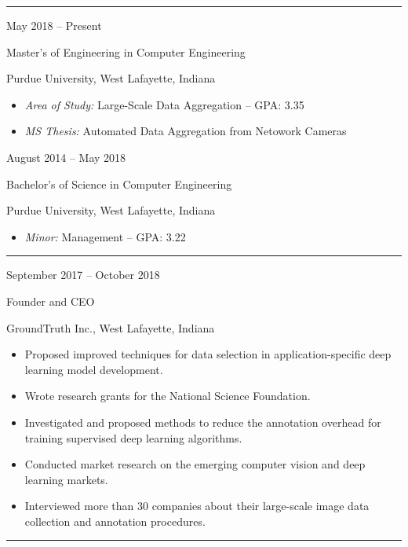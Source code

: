 \documentclass[10pt]{article}
\newlength{\cvcolumngapwidth}
\newlength{\cvleftcolumnwidth}
\newlength{\cvrightcolumnwidth}
\newcommand{\cvsectionstyle}[1]{{\normalsize\cvsectionfont\textcolor{cvsectioncolor}{#1}}}
\newcommand{\cvtitlestyle}[1]{{\large\cvtitlefont\textcolor{cvtitlecolor}{#1}}}
\newcommand{\cvdurationstyle}[1]{{\small\cvdurationfont\textcolor{cvdurationcolor}{#1}}}
\newlength{\cvafteritemskipamount}
\newlength{\cvaftersectionskipamount}
\newlength{\cvparskip}
\newcommand{\cvsection}[1]{
    \begin{minipage}[t]{\cvleftcolumnwidth}
        \raggedleft\cvsectionstyle{#1}
    \end{minipage}%
    \hspace{\cvcolumngapwidth}%
    \begin{minipage}[t]{\cvrightcolumnwidth}
        \textcolor{cvrulecolor}{\rule{\cvrightcolumnwidth}{0.3mm}}
    \end{minipage}

    \vspace{\cvaftersectionskipamount}
}
\newcommand{\cvitem}[2]{
    \begin{minipage}[t]{\cvleftcolumnwidth}
        \raggedleft #1
    \end{minipage}%
    \hspace{\cvcolumngapwidth}%
    \begin{minipage}[t]{\cvrightcolumnwidth}
        \setlength{\parskip}{\cvparskip} #2
    \end{minipage}

    \vspace{\cvafteritemskipamount}
}
\newcommand{\cvtitle}[1]{
    \cvtitlestyle{#1}

    \vspace{1mm plus 0.25mm minus 0.25mm}
    \vspace{-\cvparskip}
}
\begin{document}
\cvsection{EDUCATION}

\cvitem{
    \cvdurationstyle{May 2018 – Present}
}{
    \cvtitle{Master's of Engineering in Computer Engineering}

    Purdue University, West Lafayette, Indiana

    \begin{itemize}[leftmargin=*]
        \item \textit{Area of Study:} Large-Scale Data Aggregation -- GPA: 3.35
        \item \textit{MS Thesis:} Automated Data Aggregation from Netowork Cameras
    \end{itemize}
}
\cvitem{
    \cvdurationstyle{August 2014 – May 2018}
}{
    \cvtitle{Bachelor's of Science in Computer Engineering}

    Purdue University, West Lafayette, Indiana

    \begin{itemize}[leftmargin=*]
        \item \textit{Minor:} Management -- GPA: 3.22
    \end{itemize}
}

\cvsection{ENTREPRENURESHIP}

\cvitem{
    \cvdurationstyle{September 2017 – October 2018}
}{
    \cvtitle{Founder and CEO}

    GroundTruth Inc., West Lafayette, Indiana

    \begin{itemize}[leftmargin=*]
        \item Proposed improved techniques for data selection in application-specific deep learning model development.
        \item Wrote research grants for the National Science Foundation.
        \item Investigated and proposed methods to reduce the annotation overhead for training supervised deep learning algorithms.
        \item Conducted market research on the emerging computer vision and deep learning markets.
        \item Interviewed more than 30 companies about their large-scale image data collection and annotation procedures. 
    \end{itemize}
}

\cvsection{WORK EXPERIENCE}
\end{document}
